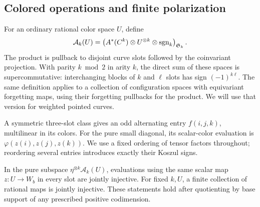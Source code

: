 \subsection{Colored operations and finite polarization}

For an ordinary rational color space \(U\), define
\[
 \mathcal A_k(U)=
 \left(
  A^*(C^k)\otimes U^{\otimes k}\otimes\mathrm{sgn}_k
 \right)_{\mathfrak S_k}.
\]
The product is pullback to disjoint curve slots followed by the
coinvariant projection.  With parity \(k\bmod2\) in arity \(k\), the
direct sum of these spaces is supercommutative: interchanging blocks
of \(k\) and \(\ell\) slots has sign \((-1)^{k\ell}\).
The same definition applies to a collection of configuration spaces
with equivariant forgetting maps, using their forgetting pullbacks
for the product.  We will use that version for weighted pointed
curves.

A symmetric three-slot class gives an odd alternating entry
\(f(i,j,k)\), multilinear in its colors.  For the pure small diagonal,
its scalar-color evaluation is
\(\varphi(z(i),z(j),z(k))\).  We use a fixed ordering of tensor factors
throughout; reordering several entries introduces exactly their
Koszul signs.

\begin{lemma}
 \label{lem:color-polarization}
In the pure subspace
\(\eta^{\otimes k}\mathcal A_k(U)\), evaluations using the same scalar
map \(z\colon U\to W_b\) in every slot are jointly injective.
For fixed \(k,U\), a finite collection of rational maps is jointly
injective.  These statements hold after quotienting by base support
of any prescribed positive codimension.
\end{lemma}

